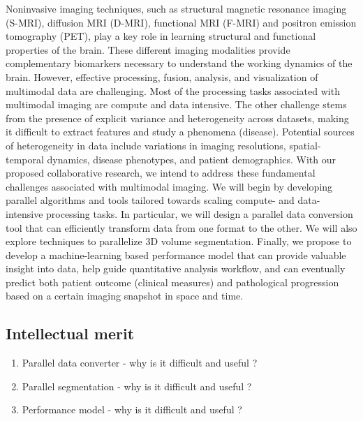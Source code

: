 \documentclass[11pt]{article}
\begin{document}
Noninvasive imaging techniques, such as structural magnetic resonance imaging (S-MRI), diffusion MRI (D-MRI), functional MRI (F-MRI) and positron emission tomography (PET), play a key role in learning structural and functional properties of the brain. These different imaging modalities provide complementary biomarkers necessary to understand the working dynamics of the brain. However, effective processing, fusion, analysis, and visualization of multimodal data are challenging. Most of the processing tasks associated with multimodal imaging are compute and data intensive. The other challenge stems from the presence of explicit variance and heterogeneity across datasets, making it difficult to extract features and study a phenomena (disease). Potential sources of heterogeneity in data include variations in imaging resolutions, spatial-temporal dynamics, disease phenotypes, and patient demographics. With our proposed collaborative research, we intend to address these fundamental challenges associated with multimodal imaging. We will begin by developing parallel algorithms and tools tailored towards scaling compute- and data- intensive processing tasks. In particular, we will design a parallel data conversion tool that can efficiently transform data from one format to the other. We will also explore techniques to parallelize 3D volume segmentation. Finally, we propose to develop a machine-learning based performance model that can provide valuable insight into data, help guide quantitative analysis workflow, and can eventually predict both patient outcome (clinical measures) and pathological progression based on a certain imaging snapshot in space and time.	


\subsection{Intellectual merit}
\begin{enumerate}
	\setlength\itemsep{-0.2em}
	\item Parallel data converter - why is it difficult and useful ?
	\item Parallel segmentation -  why is it difficult and useful ?
	\item Performance model -  why is it difficult and useful ?
\end{enumerate}
\end{document}
